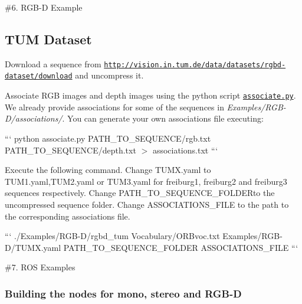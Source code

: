 \#6. R\-G\-B-\/\-D Example

\subsection*{T\-U\-M Dataset}


\begin{DoxyEnumerate}
\item Download a sequence from \href{http://vision.in.tum.de/data/datasets/rgbd-dataset/download}{\tt http\-://vision.\-in.\-tum.\-de/data/datasets/rgbd-\/dataset/download} and uncompress it.
\item Associate R\-G\-B images and depth images using the python script \href{http://vision.in.tum.de/data/datasets/rgbd-dataset/tools}{\tt associate.\-py}. We already provide associations for some of the sequences in {\itshape Examples/\-R\-G\-B-\/\-D/associations/}. You can generate your own associations file executing\-:

``` python associate.\-py P\-A\-T\-H\-\_\-\-T\-O\-\_\-\-S\-E\-Q\-U\-E\-N\-C\-E/rgb.\-txt P\-A\-T\-H\-\_\-\-T\-O\-\_\-\-S\-E\-Q\-U\-E\-N\-C\-E/depth.\-txt $>$ associations.\-txt ```
\item Execute the following command. Change {\ttfamily T\-U\-M\-X.\-yaml} to T\-U\-M1.\-yaml,T\-U\-M2.\-yaml or T\-U\-M3.\-yaml for freiburg1, freiburg2 and freiburg3 sequences respectively. Change {\ttfamily P\-A\-T\-H\-\_\-\-T\-O\-\_\-\-S\-E\-Q\-U\-E\-N\-C\-E\-\_\-\-F\-O\-L\-D\-E\-R}to the uncompressed sequence folder. Change {\ttfamily A\-S\-S\-O\-C\-I\-A\-T\-I\-O\-N\-S\-\_\-\-F\-I\-L\-E} to the path to the corresponding associations file.

``` ./\-Examples/\-R\-G\-B-\/\-D/rgbd\-\_\-tum Vocabulary/\-O\-R\-Bvoc.\-txt Examples/\-R\-G\-B-\/\-D/\-T\-U\-M\-X.\-yaml P\-A\-T\-H\-\_\-\-T\-O\-\_\-\-S\-E\-Q\-U\-E\-N\-C\-E\-\_\-\-F\-O\-L\-D\-E\-R A\-S\-S\-O\-C\-I\-A\-T\-I\-O\-N\-S\-\_\-\-F\-I\-L\-E ```
\end{DoxyEnumerate}

\#7. R\-O\-S Examples

\subsubsection*{Building the nodes for mono, stereo and R\-G\-B-\/\-D}



